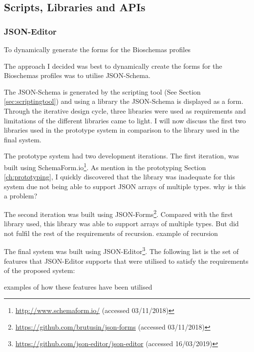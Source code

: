 \newpage
\subsection{Scripts, Libraries and APIs}\label{sec:libraries}

\subsubsection{JSON-Editor} \label{sec:jsoneditor}
To dynamically generate the forms for the Bioschemas profiles 


The approach I decided was best to dynamically create the forms for the Bioschemas profiles was to utilise JSON-Schema. 


The JSON-Schema is generated by the scripting tool (See Section \ref{sec:scriptingtool}) and using a library the JSON-Schema is displayed as a form. Through the iterative design cycle, three libraries were used as requirements and limitations of the different libraries came to light. I will now discuss the first two libraries used in the prototype system in comparison to the library used in the final system.

The prototype system had two development iterations. The first iteration, was built using SchemaForm.io\footnote{\url{http://www.schemaform.io/} (accessed 03/11/2018)}. As mention in the prototyping Section \ref{ch:prototyping}, I quickly discovered that the library was inadequate for this system due not being able to support JSON arrays of multiple types. why is this a problem?


The second iteration was built using JSON-Forms\footnote{\url{https://github.com/brutusin/json-forms} (accessed 03/11/2018)}. Compared with the first library used, this library was able to support arrays of multiple types. But did not fulfil the rest of the requirements of recursion. example of recursion

The final system was built using JSON-Editor\footnote{\url{https://github.com/json-editor/json-editor} (accessed 16/03/2019)}. The following list is the set of features that JSON-Editor supports that were utilised to satisfy the requirements of the proposed system:

examples of how these features have been utilised

